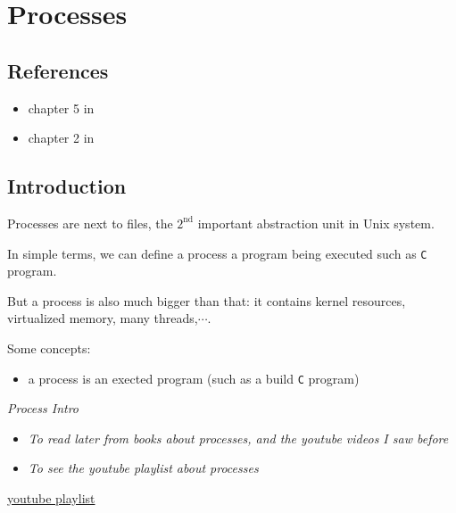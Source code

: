 \documentclass[12pt,a4paper]{book}
\begin{document}
\chapter{Processes}

\section{References}

\begin{itemize}

\item chapter 5 in \cite{book_Linux_System_Programming_Robert_Love}

\item chapter 2 in \cite{book_modern_operating_system}

\end{itemize}

\section{Introduction}

Processes are next to files, the $\mathrm{2}^\mathrm{nd}$ important abstraction unit in Unix system.

In simple terms, we can define a process a program being executed such as \verb|C| program.

But a process is also much bigger than that: it contains kernel resources, virtualized memory, many threads,$\cdots$.

Some concepts:

\begin{itemize}

\item a process is an exected program (such as a build \verb|C| program)

\end{itemize}

 \textit{Process Intro}

\begin{itemize}

\item \textit{To read later from books about processes, and the youtube videos I saw before}

\item \textit{To see the youtube playlist about processes}

\end{itemize}

\underline{youtube playlist}
\end{document}
